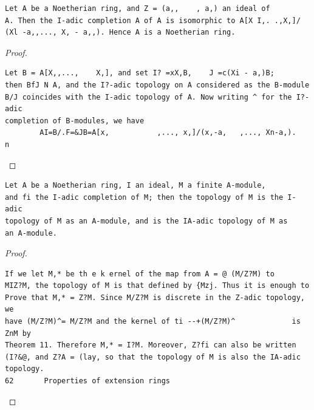 \begin{theorem}\label{mcrt-auto-theorem-8-12}\uses{}
\begin{verbatim}
Let A be a Noetherian ring, and Z = (a,,    , a,) an ideal of
A. Then the I-adic completion A of A is isomorphic to A[X I,. .,X,]/
(Xl -a,,..., X, - a,,). Hence A is a Noetherian ring.
\end{verbatim}
\end{theorem}
\begin{proof}
\begin{verbatim}
Let B = A[X,,...,    X,], and set I? =xX,B,    J =c(Xi - a,)B;
then BfJ N A, and the I?-adic topology on A considered as the B-module
B/J coincides with the I-adic topology of A. Now writing ^ for the I?-adic
completion of B-modules, we have
        AI=B/.F=&JB=A[x,           ,..., x,]/(x,-a,   ,..., Xn-a,).    n
\end{verbatim}
\end{proof}


\begin{theorem}\label{mcrt-auto-theorem-8-13}\uses{}
\begin{verbatim}
Let A be a Noetherian ring, I an ideal, M a finite A-module,
and fi the I-adic completion of M; then the topology of M is the I-adic
topology of M as an A-module, and is the IA-adic topology of M as
an A-module.
\end{verbatim}
\end{theorem}
\begin{proof}
\begin{verbatim}
If we let M,* be th e k ernel of the map from A = @ (M/Z?M) to
MIZ?M, the topology of M is that defined by {Mzj. Thus it is enough to
Prove that M,* = Z?M. Since M/Z?M is discrete in the Z-adic topology, we
have (M/Z?M)^= M/Z?M and the kernel of ti --+(M/Z?M)^             is ZnM by
Theorem 11. Therefore M,* = I?M. Moreover, Z?fi can also be written
(I?&@, and Z?A = (lay, so that the topology of M is also the IA-adic
topology.
62       Properties of extension rings
\end{verbatim}
\end{proof}


